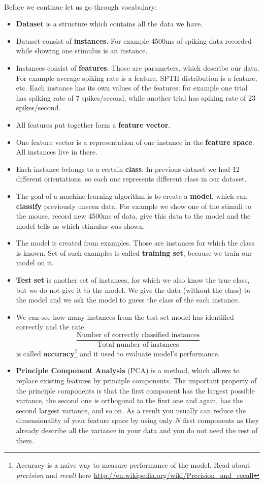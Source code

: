 \documentclass[a4paper,11pt]{article}
\begin{document}
%
%
\ \\
Before we continue let us go through vocabulary:
\begin{itemize}
\itemsep 0em
	\item \textbf{Dataset} is a structure which contains all the data we have.
	\item Dataset consist of \textbf{instances}. For example 4500ms of spiking data recorded while showing one stimulus is an instance.
	\item Instances consist of \textbf{features}. Those are parameters, which describe our data. For example average spiking rate is a feature, SPTH distribution is a feature, etc. Each instance has its own values of the features: for example one trial has spiking rate of 7 spikes/second, while another trial has spiking rate of 23 spikes/second.
	\item All features put together form a \textbf{feature vector}.
	\item One feature vector is a representation of one instance in the \textbf{feature space}. All instances live in there.
	\item Each instance belongs to a certain \textbf{class}. In previous dataset we had 12 different orientations, so each one represents different class in our dataset.
	\item The goal of a machine learning algorithm is to create a \textbf{model}, which can \textbf{classify} previously unseen data. For example we show one of the stimuli to the mouse, record new 4500ms of data, give this data to the model and the model tells us which stimulus was shown.
	\item The model is created from examples. Those are instances for which the class is known. Set of such examples is called \textbf{training set}, because we train our model on it.
	\item \textbf{Test set} is another set of instances, for which we also know the true class, but we do not give it to the model. We give the data (without the class) to the model and we ask the model to guess the class of the each instance.
	\item We can see how many instances from the test set model has identified correctly and the rate $$\displaystyle\frac{\text{Number of correctly classified instances}}{\text{Total number of instances}}$$ is called \textbf{accuracy}\footnote{Accuracy is a naive way to measure performance of the model. Read about \emph{precision} and \emph{recall} here \url{http://en.wikipedia.org/wiki/Precision_and_recall}} and it used to evaluate model's performance.
	\item \textbf{Principle Component Analysis} (PCA) is a method, which allows to replace existing features by principle components. The important property of the principle components is that the first component has the largest possible variance, the second one is orthogonal to the first one and again, has the second largest variance, and so on. As a result you usually can reduce the dimensionality of your feature space by using only $N$ first components as they already describe all the variance in your data and you do not need the rest of them.
\end{itemize}
\end{document}
